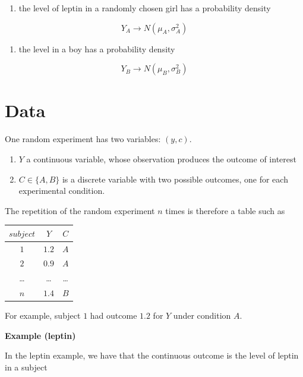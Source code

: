 \documentclass[
]{book}
\providecommand{\tightlist}{%
  \setlength{\itemsep}{0pt}\setlength{\parskip}{0pt}}
\begin{document}
\begin{enumerate}
\def\labelenumi{\arabic{enumi})}
\tightlist
\item
  the level of leptin in a randomly chosen girl has a probability density
\end{enumerate}

\[Y_A \rightarrow N(\mu_A, \sigma_A^2)\]

\begin{enumerate}
\def\labelenumi{\arabic{enumi})}
\setcounter{enumi}{1}
\tightlist
\item
  the level in a boy has a probability density
\end{enumerate}

\[Y_B \rightarrow N(\mu_B, \sigma_B^2)\]

\hypertarget{data-1}{%
\section{Data}\label{data-1}}

One random experiment has two variables: \((y, c)\).

\begin{enumerate}
\def\labelenumi{\arabic{enumi}.}
\item
  \(Y\) a continuous variable, whose observation produces the outcome of interest
\item
  \(C \in \{A,B\}\) is a discrete variable with two possible outcomes, one for each experimental condition.
\end{enumerate}

The repetition of the random experiment \(n\) times is therefore a table such as

\begin{longtable}[]{@{}ccc@{}}
\toprule\noalign{}
\(subject\) & \(Y\) & \(C\) \\
\midrule\noalign{}
\endhead
\bottomrule\noalign{}
\endlastfoot
\(1\) & \(1.2\) & \(A\) \\
\(2\) & \(0.9\) & \(A\) \\
\ldots{} & \ldots{} & \ldots{} \\
\(n\) & \(1.4\) & \(B\) \\
\end{longtable}

For example, subject \(1\) had outcome \(1.2\) for \(Y\) under condition \(A\).

\textbf{Example (leptin)}

In the leptin example, we have that the continuous outcome is the level of leptin in a subject
\end{document}
